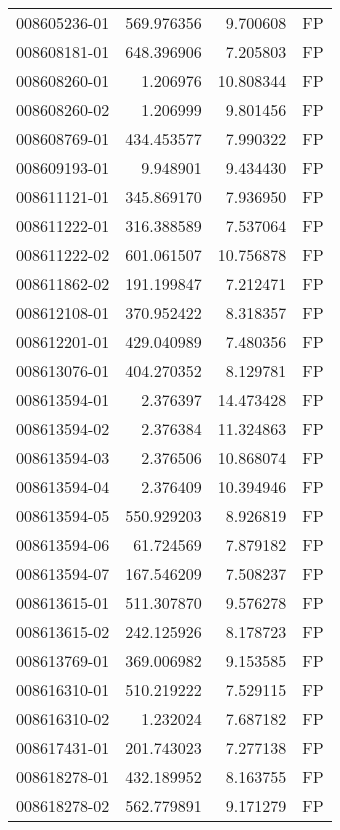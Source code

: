 \begin{tabular}{lrrl}
008605236-01 &  569.976356 &       9.700608 &   FP \\
008608181-01 &  648.396906 &       7.205803 &   FP \\
008608260-01 &    1.206976 &      10.808344 &   FP \\
008608260-02 &    1.206999 &       9.801456 &   FP \\
008608769-01 &  434.453577 &       7.990322 &   FP \\
008609193-01 &    9.948901 &       9.434430 &   FP \\
008611121-01 &  345.869170 &       7.936950 &   FP \\
008611222-01 &  316.388589 &       7.537064 &   FP \\
008611222-02 &  601.061507 &      10.756878 &   FP \\
008611862-02 &  191.199847 &       7.212471 &   FP \\
008612108-01 &  370.952422 &       8.318357 &   FP \\
008612201-01 &  429.040989 &       7.480356 &   FP \\
008613076-01 &  404.270352 &       8.129781 &   FP \\
008613594-01 &    2.376397 &      14.473428 &   FP \\
008613594-02 &    2.376384 &      11.324863 &   FP \\
008613594-03 &    2.376506 &      10.868074 &   FP \\
008613594-04 &    2.376409 &      10.394946 &   FP \\
008613594-05 &  550.929203 &       8.926819 &   FP \\
008613594-06 &   61.724569 &       7.879182 &   FP \\
008613594-07 &  167.546209 &       7.508237 &   FP \\
008613615-01 &  511.307870 &       9.576278 &   FP \\
008613615-02 &  242.125926 &       8.178723 &   FP \\
008613769-01 &  369.006982 &       9.153585 &   FP \\
008616310-01 &  510.219222 &       7.529115 &   FP \\
008616310-02 &    1.232024 &       7.687182 &   FP \\
008617431-01 &  201.743023 &       7.277138 &   FP \\
008618278-01 &  432.189952 &       8.163755 &   FP \\
008618278-02 &  562.779891 &       9.171279 &   FP \\

\end{tabular}
